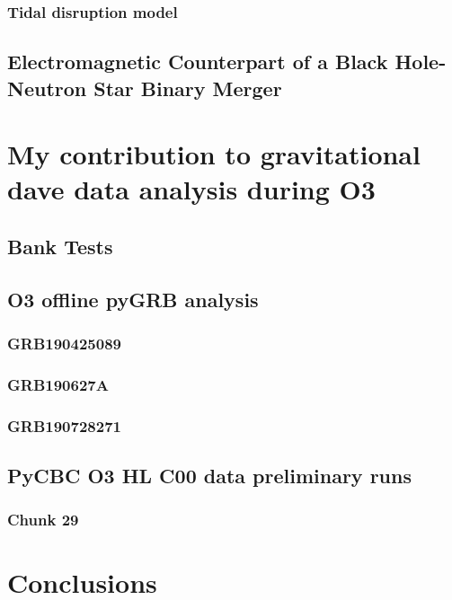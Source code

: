 \documentclass[binding=0.6cm, LaM]{sapthesis}
\begin{document}
\subsection{Tidal disruption model}




\section{Electromagnetic Counterpart of a Black Hole-Neutron Star Binary Merger}


\chapter{My contribution to gravitational dave data analysis during O3}

\section{Bank Tests}

\section{O3 offline pyGRB analysis}

\subsection{GRB190425089}

\subsection{GRB190627A}

\subsection{GRB190728271}

\section{PyCBC O3 HL C00 data preliminary runs}

\subsection{Chunk 29}

\chapter{Conclusions}


\backmatter
\cleardoublepage


\begin{thebibliography}{100}
\end{thebibliography}
\end{document}

